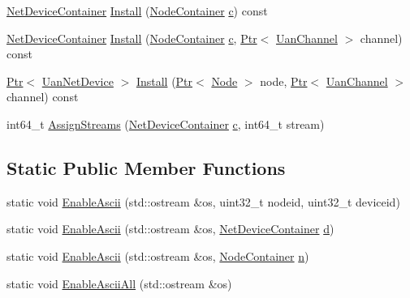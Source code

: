 \begin{DoxyCompactItemize}
\item 
\hyperlink{classns3_1_1NetDeviceContainer}{Net\+Device\+Container} \hyperlink{classns3_1_1UanHelper_a283475798bb2df2ff11c53b68d2f1361}{Install} (\hyperlink{classns3_1_1NodeContainer}{Node\+Container} \hyperlink{mmwave_2model_2fading-traces_2fading__trace__generator_8m_ae0323a9039add2978bf5b49550572c7c}{c}) const 
\item 
\hyperlink{classns3_1_1NetDeviceContainer}{Net\+Device\+Container} \hyperlink{classns3_1_1UanHelper_a2b8399c92d93f7e69f13bc218f097e25}{Install} (\hyperlink{classns3_1_1NodeContainer}{Node\+Container} \hyperlink{mmwave_2model_2fading-traces_2fading__trace__generator_8m_ae0323a9039add2978bf5b49550572c7c}{c}, \hyperlink{classns3_1_1Ptr}{Ptr}$<$ \hyperlink{classns3_1_1UanChannel}{Uan\+Channel} $>$ channel) const 
\item 
\hyperlink{classns3_1_1Ptr}{Ptr}$<$ \hyperlink{classns3_1_1UanNetDevice}{Uan\+Net\+Device} $>$ \hyperlink{classns3_1_1UanHelper_a30e0ba40909ec03e846c5c041c93c2df}{Install} (\hyperlink{classns3_1_1Ptr}{Ptr}$<$ \hyperlink{classns3_1_1Node}{Node} $>$ node, \hyperlink{classns3_1_1Ptr}{Ptr}$<$ \hyperlink{classns3_1_1UanChannel}{Uan\+Channel} $>$ channel) const 
\item 
int64\+\_\+t \hyperlink{classns3_1_1UanHelper_a90e299300025e5ed72cc2d15eec175a6}{Assign\+Streams} (\hyperlink{classns3_1_1NetDeviceContainer}{Net\+Device\+Container} \hyperlink{mmwave_2model_2fading-traces_2fading__trace__generator_8m_ae0323a9039add2978bf5b49550572c7c}{c}, int64\+\_\+t stream)
\end{DoxyCompactItemize}
\subsection*{Static Public Member Functions}
\begin{DoxyCompactItemize}
\item 
static void \hyperlink{classns3_1_1UanHelper_a6346f7d56711007f193cb842dce46896}{Enable\+Ascii} (std\+::ostream \&os, uint32\+\_\+t nodeid, uint32\+\_\+t deviceid)
\item 
static void \hyperlink{classns3_1_1UanHelper_afb3901e0292a0b160606ebcbf5fdb2d9}{Enable\+Ascii} (std\+::ostream \&os, \hyperlink{classns3_1_1NetDeviceContainer}{Net\+Device\+Container} \hyperlink{lte__pathloss_8m_a1aabac6d068eef6a7bad3fdf50a05cc8}{d})
\item 
static void \hyperlink{classns3_1_1UanHelper_a8337cb4e1ea3ab9d4617f0f6a0807e17}{Enable\+Ascii} (std\+::ostream \&os, \hyperlink{classns3_1_1NodeContainer}{Node\+Container} \hyperlink{lte__link__budget__x2__handover__measures_8m_abdb05bc5a064cf642a06c83b3392f148}{n})
\item 
static void \hyperlink{classns3_1_1UanHelper_abbb973784878ac6addc48cf2a6a18da0}{Enable\+Ascii\+All} (std\+::ostream \&os)
\end{DoxyCompactItemize}
